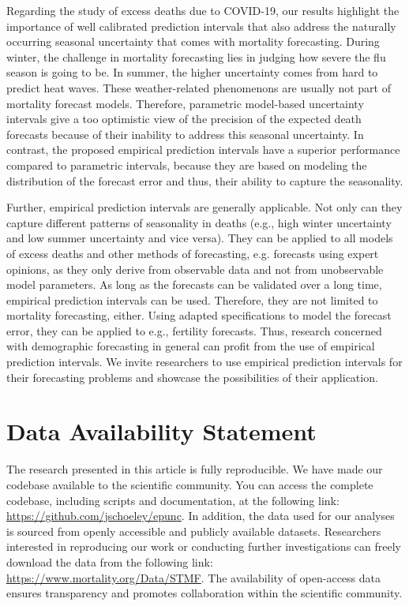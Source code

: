 \documentclass[12pt]{article}
\begin{document}
Regarding the study of excess deaths due to COVID-19, our results highlight the importance of well calibrated prediction intervals that also address the naturally occurring seasonal uncertainty that comes with mortality forecasting. During winter, the challenge in mortality forecasting lies in judging how severe the flu season is going to be. In summer, the higher uncertainty comes from hard to predict heat waves. These weather-related phenomenons are usually not part of mortality forecast models. Therefore, parametric model-based uncertainty intervals give a too optimistic view of the precision of the expected death forecasts because of their inability to address this seasonal uncertainty. In contrast, the proposed empirical prediction intervals have a superior performance compared to parametric intervals, because they are based on modeling the distribution of the forecast error and thus, their ability to capture the seasonality.

Further, empirical prediction intervals are generally applicable. Not only can they capture different patterns of seasonality in deaths (e.g., high winter uncertainty and low summer uncertainty and vice versa). They can be applied to all models of excess deaths and other methods of forecasting, e.g. forecasts using expert opinions, as they only derive from observable data and not from unobservable model parameters. As long as the forecasts can be validated over a long time, empirical prediction intervals can be used. Therefore, they are not limited to mortality forecasting, either. Using adapted specifications to model the forecast error, they can be applied to e.g., fertility forecasts. Thus, research concerned with demographic forecasting in general can profit from the use of empirical prediction intervals. We invite researchers to use empirical prediction intervals for their forecasting problems and showcase the possibilities of their application.

\section*{Data Availability Statement}
The research presented in this article is fully reproducible. We have made our codebase available to the scientific community. You can access the complete codebase, including scripts and documentation, at the following link: \url{https://github.com/jschoeley/epunc}. In addition, the data used for our analyses is sourced from openly accessible and publicly available datasets. Researchers interested in reproducing our work or conducting further investigations can freely download the data from the following link: \url{https://www.mortality.org/Data/STMF}. The availability of open-access data ensures transparency and promotes collaboration within the scientific community.
\end{document}
